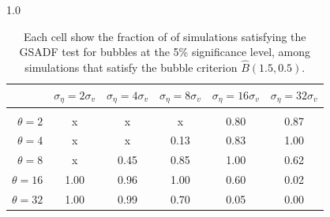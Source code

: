\documentclass[12pt]{article}
\begin{document}
\begin{table}[h!]
\vspace{10pt}
\begin{subtable}{1.0\textwidth}
    \centering
\begin{tabular}{rccccc}
\hline  
            & \multicolumn{1}{l}{$\sigma_{\eta} =2\sigma_{v}$} & \multicolumn{1}{l}{$\sigma_{\eta} =4\sigma_{v}$} & \multicolumn{1}{l}{$\sigma_{\eta} =8\sigma_{v}$} & \multicolumn{1}{l}{$\sigma_{\eta} =16\sigma_{v}$} & \multicolumn{1}{l}{$\sigma_{\eta} =32\sigma_{v}$} \\ \hline  \vspace{-3mm} \\        
$\theta=2$  & x                                                 & x                                                 & x                                                 & 0.80                                               & 0.87                                               \\ \hline
$\theta=4$  & x                                                 & x                                                 & 0.13                                              & 0.83                                               & 1.00                                               \\ \hline
$\theta=8$  & x                                                 & 0.45                                              & 0.85                                              & 1.00                                               & 0.62                                               \\ \hline
$\theta=16$ & 1.00                                              & 0.96                                              & 1.00                                              & 0.60                                               & 0.02                                               \\ \hline
$\theta=32$ & 1.00                                              & 0.99                                              & 0.70                                              & 0.05                                               & 0.00                                               \\ \hline
\end{tabular}
\end{subtable}

\caption{Each cell show the fraction of of simulations satisfying the GSADF test for bubbles at the 5\% significance level, among simulations that satisfy the bubble criterion $\widehat{B}(1.5,0.5)$.}
\label{GSADFpowersamps}
\end{table}
\pagebreak
\end{document}
